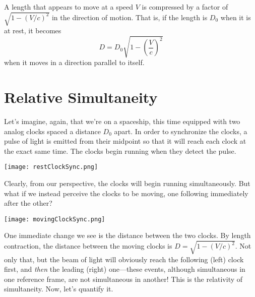 \documentclass[../p023main.tex]{subfiles}
\begin{document}
\begin{summary}
    A length that appears to move at a speed $V$ is compressed by a factor of $\sqrt{1 - \left( V / c \right)^2}$ in the direction of motion.
    That is, if the length is $D_0$ when it is at rest, it becomes
    \[ D = D_0 \sqrt{1 - \left( \frac{V}{c} \right)^2} \]
    when it moves in a direction parallel to itself.
\end{summary}
\pagebreak

\section{Relative Simultaneity}
Let's imagine, again, that we're on a spaceship, this time equipped with two analog clocks spaced a distance $D_0$ apart.
In order to synchronize the clocks, a pulse of light is emitted from their midpoint so that it will reach each clock at the exact same time.
The clocks begin running when they detect the pulse.
\begin{center}
    \texttt{[image: restClockSync.png]}
\end{center}
Clearly, from our perspective, the clocks will begin running simultaneously.
But what if we instead perceive the clocks to be moving, one following immediately after the other?
\begin{center}
    \texttt{[image: movingClockSync.png]}
\end{center}
One immediate change we see is the distance between the two clocks.
By length contraction, the distance between the moving clocks is $D = \sqrt{1 - \left( V / c \right)^2}$.
Not only that, but the beam of light will obviously reach the following (left) clock first, and \textit{then} the leading (right) one---these events, although simultaneous in one reference frame, are not simultaneous in another!
This is the relativity of simultaneity.
Now, let's quantify it.
\end{document}
